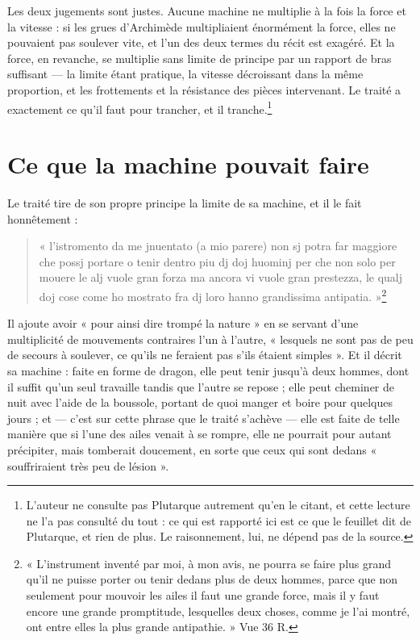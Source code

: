 \documentclass[11pt,a4paper]{article}
\begin{document}
Les deux jugements sont justes. Aucune machine ne multiplie à la fois la force
et la vitesse : si les grues d'Archimède multipliaient énormément la force, elles
ne pouvaient pas soulever vite, et l'un des deux termes du récit est exagéré. Et
la force, en revanche, se multiplie sans limite de principe par un rapport de
bras suffisant — la limite étant pratique, la vitesse décroissant dans la même
proportion, et les frottements et la résistance des pièces intervenant. Le
traité a exactement ce qu'il faut pour trancher, et il
tranche.\footnote{L'auteur ne consulte pas Plutarque autrement qu'en le citant,
et cette lecture ne l'a pas consulté du tout : ce qui est rapporté ici est ce
que le feuillet dit de Plutarque, et rien de plus. Le raisonnement, lui, ne
dépend pas de la source.}

\section*{Ce que la machine pouvait faire}

Le traité tire de son propre principe la limite de sa machine, et il le fait
honnêtement :

\begin{quote}
« l'istromento da me jnuentato (a mio parere) non sj potra far maggiore che
possj portare o tenir dentro piu dj doj huominj per che non solo per mouere le
alj vuole gran forza ma ancora vi vuole gran prestezza, le qualj doj cose come
ho mostrato fra dj loro hanno grandissima antipatia. »\footnote{« L'instrument
inventé par moi, à mon avis, ne pourra se faire plus grand qu'il ne puisse
porter ou tenir dedans plus de deux hommes, parce que non seulement pour mouvoir
les ailes il faut une grande force, mais il y faut encore une grande promptitude,
lesquelles deux choses, comme je l'ai montré, ont entre elles la plus grande
antipathie. » Vue 36 R.}
\end{quote}

Il ajoute avoir « pour ainsi dire trompé la nature » en se servant d'une
multiplicité de mouvements contraires l'un à l'autre, « lesquels ne sont pas de
peu de secours à soulever, ce qu'ils ne feraient pas s'ils étaient simples ». Et
il décrit sa machine : faite en forme de dragon, elle peut tenir jusqu'à deux
hommes, dont il suffit qu'un seul travaille tandis que l'autre se repose ; elle
peut cheminer de nuit avec l'aide de la boussole, portant de quoi manger et
boire pour quelques jours ; et — c'est sur cette phrase que le traité s'achève —
elle est faite de telle manière que si l'une des ailes venait à se rompre, elle
ne pourrait pour autant précipiter, mais tomberait doucement, en sorte que ceux
qui sont dedans « souffriraient très peu de lésion ».
\end{document}
